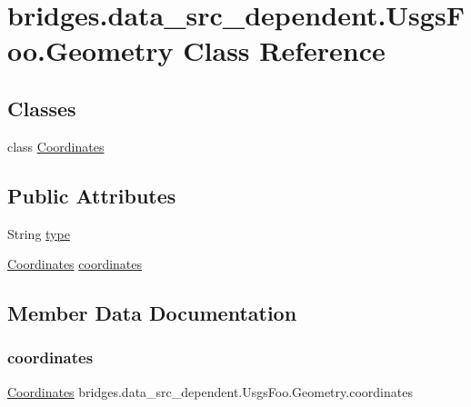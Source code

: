 \hypertarget{classbridges_1_1data__src__dependent_1_1_usgs_foo_1_1_geometry}{}\section{bridges.\+data\+\_\+src\+\_\+dependent.\+Usgs\+Foo.\+Geometry Class Reference}
\label{classbridges_1_1data__src__dependent_1_1_usgs_foo_1_1_geometry}
\subsection*{Classes}
\begin{DoxyCompactItemize}
\item 
class \mbox{\hyperlink{classbridges_1_1data__src__dependent_1_1_usgs_foo_1_1_geometry_1_1_coordinates}{Coordinates}}
\end{DoxyCompactItemize}
\subsection*{Public Attributes}
\begin{DoxyCompactItemize}
\item 
String \mbox{\hyperlink{classbridges_1_1data__src__dependent_1_1_usgs_foo_1_1_geometry_a985b3a46dad2fcd4e798d2f51198bcfd}{type}}
\item 
\mbox{\hyperlink{classbridges_1_1data__src__dependent_1_1_usgs_foo_1_1_geometry_1_1_coordinates}{Coordinates}} \mbox{\hyperlink{classbridges_1_1data__src__dependent_1_1_usgs_foo_1_1_geometry_a339e388c47a5d03c946c875d690ee514}{coordinates}}
\end{DoxyCompactItemize}


\subsection{Member Data Documentation}
\mbox{\label{classbridges_1_1data__src__dependent_1_1_usgs_foo_1_1_geometry_a339e388c47a5d03c946c875d690ee514}} 
\subsubsection{\texorpdfstring{coordinates}{coordinates}}
{\footnotesize\ttfamily \mbox{\hyperlink{classbridges_1_1data__src__dependent_1_1_usgs_foo_1_1_geometry_1_1_coordinates}{Coordinates}} bridges.\+data\+\_\+src\+\_\+dependent.\+Usgs\+Foo.\+Geometry.\+coordinates}

